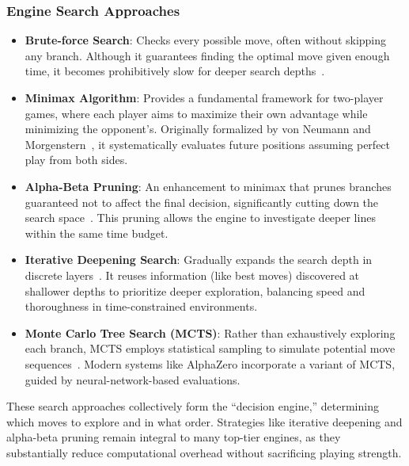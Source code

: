 \documentclass[12pt,a4paper]{article}
\begin{document}
\subsubsection{Engine Search Approaches}
\label{sec:engine_search_approaches}

\begin{itemize}
    \item \textbf{Brute-force Search}: 
    Checks every possible move, often without skipping any branch. Although it guarantees finding the optimal move given enough time, it becomes prohibitively slow for deeper search depths~\cite{Shannon1950}.

    \item \textbf{Minimax Algorithm}: 
    Provides a fundamental framework for two-player games, where each player aims to maximize their own advantage while minimizing the opponent’s. Originally formalized by von Neumann and Morgenstern~\cite{vonNeumann1944}, it systematically evaluates future positions assuming perfect play from both sides.

    \item \textbf{Alpha-Beta Pruning}: 
    An enhancement to minimax that prunes branches guaranteed not to affect the final decision, significantly cutting down the search space~\cite{Knuth1975}. This pruning allows the engine to investigate deeper lines within the same time budget.

    \item \textbf{Iterative Deepening Search}:
    Gradually expands the search depth in discrete layers~\cite{Korf1985}. It reuses information (like best moves) discovered at shallower depths to prioritize deeper exploration, balancing speed and thoroughness in time-constrained environments.

    \item \textbf{Monte Carlo Tree Search (MCTS)}:
    Rather than exhaustively exploring each branch, MCTS employs statistical sampling to simulate potential move sequences~\cite{Coulom2006}. Modern systems like AlphaZero incorporate a variant of MCTS, guided by neural-network-based evaluations.

\end{itemize}

These search approaches collectively form the “decision engine,” determining which moves to explore and in what order. Strategies like iterative deepening and alpha-beta pruning remain integral to many top-tier engines, as they substantially reduce computational overhead without sacrificing playing strength.
\end{document}

